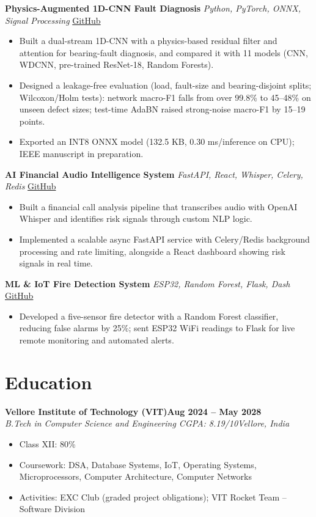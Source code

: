 \documentclass[letterpaper,10pt]{article}
\newcommand{\role}[4]{%
  \textbf{#1}\hfill\textbf{#2}\\
  \textit{#3}\hfill\textit{#4}\par}
\newcommand{\project}[3]{%
  \textbf{#1} \textbar{} \textit{#2} \textbar{} \href{#3}{GitHub}\par}
\begin{document}
\project{Physics-Augmented 1D-CNN Fault Diagnosis}{Python, PyTorch, ONNX, Signal Processing}{https://github.com/Vaibhav8075/-Physics-Augmented-1D-CNN}
\begin{itemize}
  \item Built a dual-stream 1D-CNN with a physics-based residual filter and attention for bearing-fault diagnosis, and compared it with 11 models (CNN, WDCNN, pre-trained ResNet-18, Random Forests).
  \item Designed a leakage-free evaluation (load, fault-size and bearing-disjoint splits; Wilcoxon/Holm tests): network macro-F1 falls from over 99.8\% to 45--48\% on unseen defect sizes; test-time AdaBN raised strong-noise macro-F1 by 15--19 points.
  \item Exported an INT8 ONNX model (132.5 KB, 0.30 ms/inference on CPU); IEEE manuscript in preparation.
\end{itemize}
\vspace{2pt}

\project{AI Financial Audio Intelligence System}{FastAPI, React, Whisper, Celery, Redis}{https://github.com/Vaibhav8075/Financial-Technology}
\begin{itemize}
  \item Built a financial call analysis pipeline that transcribes audio with OpenAI Whisper and identifies risk signals through custom NLP logic.
  \item Implemented a scalable async FastAPI service with Celery/Redis background processing and rate limiting, alongside a React dashboard showing risk signals in real time.
\end{itemize}
\vspace{2pt}

\project{ML \& IoT Fire Detection System}{ESP32, Random Forest, Flask, Dash}{https://github.com/Vaibhav8075/IOT-ML-Project}
\begin{itemize}
  \item Developed a five-sensor fire detector with a Random Forest classifier, reducing false alarms by 25\%; sent ESP32 WiFi readings to Flask for live remote monitoring and automated alerts.
\end{itemize}

\section{Education}

\role{Vellore Institute of Technology (VIT)}{Aug 2024 -- May 2028}{B.Tech in Computer Science and Engineering \textbar{} CGPA: 8.19/10}{Vellore, India}
\begin{itemize}
  \item Class XII: 80\%
  \item Coursework: DSA, Database Systems, IoT, Operating Systems, Microprocessors, Computer Architecture, Computer Networks
  \item Activities: EXC Club (graded project obligations); VIT Rocket Team -- Software Division
\end{itemize}
\end{document}
